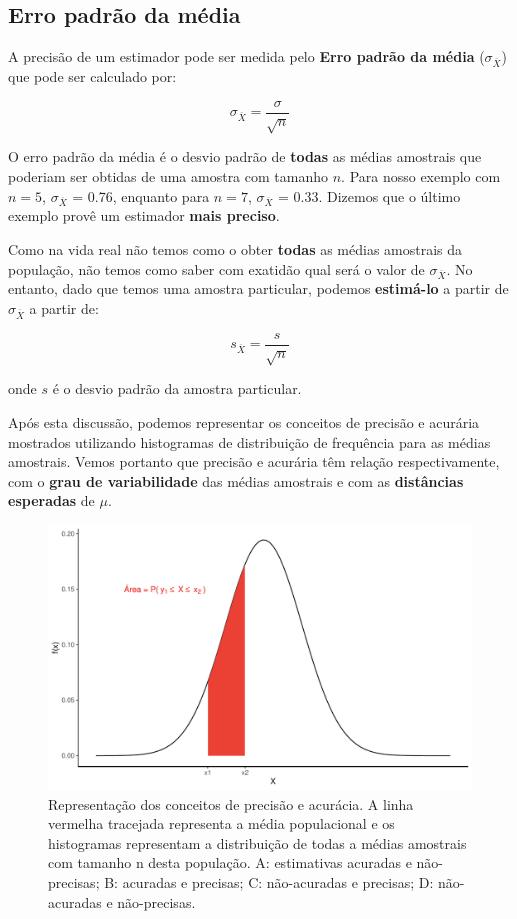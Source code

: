 \documentclass[
]{book}
\begin{document}
\hypertarget{erro-padruxe3o-da-muxe9dia}{%
\subsection{Erro padrão da média}\label{erro-padruxe3o-da-muxe9dia}}

A precisão de um estimador pode ser medida pelo \textbf{Erro padrão da média} (\(\sigma_{\overline{X}}\)) que pode ser calculado por:

\[\sigma_{\overline{X}} = \frac{\sigma}{\sqrt{n}}\]

O erro padrão da média é o desvio padrão de \textbf{todas} as médias amostrais que poderiam ser obtidas de uma amostra com tamanho \(n\). Para nosso exemplo com \(n = 5\), \(\sigma_{\overline{X}}\) = 0.76, enquanto para \(n = 7\), \(\sigma_{\overline{X}}\) = 0.33. Dizemos que o último exemplo provê um estimador \textbf{mais preciso}.

Como na vida real não temos como o obter \textbf{todas} as médias amostrais da população, não temos como saber com exatidão qual será o valor de \(\sigma_{\overline{X}}\). No entanto, dado que temos uma amostra particular, podemos \textbf{estimá-lo} a partir de \(\sigma_{\overline{X}}\) a partir de:

\[s_{\overline{X}} = \frac{s}{\sqrt{n}}\]

onde \(s\) é o desvio padrão da amostra particular.

Após esta discussão, podemos representar os conceitos de precisão e acurária mostrados utilizando histogramas de distribuição de frequência para as médias amostrais. Vemos portanto que precisão e acurária têm relação respectivamente, com o \textbf{grau de variabilidade} das médias amostrais e com as \textbf{distâncias esperadas} de \(\mu\).

\begin{figure}

{\centering \includegraphics{probest-cambientais_files/figure-latex/unnamed-chunk-62-1} 

}

\caption{Representação dos conceitos de precisão e acurácia. A linha vermelha tracejada representa a média populacional e os histogramas representam a distribuição de todas a médias amostrais com tamanho n desta população. A: estimativas acuradas e não-precisas; B: acuradas e precisas; C: não-acuradas e precisas; D: não-acuradas e não-precisas.}\label{fig:unnamed-chunk-62}
\end{figure}
\end{document}
